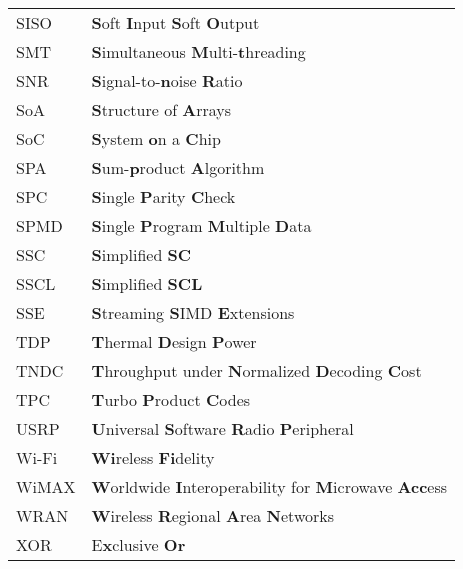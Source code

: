 \begin{center}
\begin{longtable}{ p{}  p{} }
SISO        & \textbf{S}oft \textbf{I}nput \textbf{S}oft \textbf{O}utput                                                      \\
SMT         & \textbf{S}imultaneous \textbf{M}ulti-\textbf{t}hreading                                                         \\
SNR         & \textbf{S}ignal-to-\textbf{n}oise \textbf{R}atio                                                                \\
SoA         & \textbf{S}tructure of \textbf{A}rrays                                                                           \\
SoC         & \textbf{S}ystem \textbf{o}n a \textbf{C}hip                                                                     \\
SPA         & \textbf{S}um-\textbf{p}roduct \textbf{A}lgorithm                                                                \\
SPC         & \textbf{S}ingle \textbf{P}arity \textbf{C}heck                                                                  \\
SPMD        & \textbf{S}ingle \textbf{P}rogram \textbf{M}ultiple \textbf{D}ata                                                \\
SSC         & \textbf{S}implified \textbf{SC}                                                                                 \\
SSCL        & \textbf{S}implified \textbf{SCL}                                                                                \\
SSE         & \textbf{S}treaming \textbf{S}IMD \textbf{E}xtensions                                                            \\
TDP         & \textbf{T}hermal \textbf{D}esign \textbf{P}ower                                                                 \\
TNDC        & \textbf{T}hroughput under \textbf{N}ormalized \textbf{D}ecoding \textbf{C}ost                                   \\
TPC         & \textbf{T}urbo \textbf{P}roduct \textbf{C}odes                                                                  \\
USRP        & \textbf{U}niversal \textbf{S}oftware \textbf{R}adio \textbf{P}eripheral                                         \\
Wi-Fi       & \textbf{Wi}reless \textbf{Fi}delity                                                                             \\
WiMAX       & \textbf{W}orldwide \textbf{I}nteroperability for \textbf{M}icrowave \textbf{Acc}ess                             \\
WRAN        & \textbf{W}ireless \textbf{R}egional \textbf{A}rea \textbf{N}etworks                                             \\
XOR         & E\textbf{x}clusive \textbf{Or}                                                                                  \\
\end{longtable}
\end{center}
